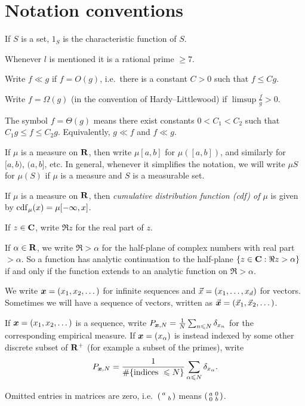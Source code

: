 \section{Notation conventions}

If $S$ is a set, $1_S$ is the characteristic function of $S$. 

Whenever $l$ is mentioned it is a rational prime $\geqslant 7$. 

Write $f\ll g$ if $f = O(g)$, i.e.~there is a constant $C>0$ such that 
$f \leqslant C g$. 

Write $f=\Omega(g)$ (in the convention of Hardy--Littlewood) if 
$\limsup \frac f g > 0$. 

The symbol $f = \Theta(g)$ means there exist constants $0<C_1<C_2$ such that 
$C_1 g \leqslant f \leqslant C_2 g$. Equivalently, $g \ll f$ and $f \ll g$. 

If $\mu$ is a measure on $\mathbf{R}$, then write $\mu[a,b]$ for $\mu([a,b])$, and 
similarly for $[a,b)$, $(a,b]$, etc. In general, whenever it simplifies the 
notation, we will write $\mu S$ for $\mu(S)$ if $\mu$ is a measure and 
$S$ is a measurable set. 

If $\mu$ is a measure on $\mathbf{R}$, then \emph{cumulative distribution function 
(cdf) of $\mu$} is given by $\operatorname{cdf}_\mu(x) = \mu[-\infty,x]$. 

If $z\in \mathbf{C}$, write $\Re z$ for the real part of $z$. 

If $\alpha\in \mathbf{R}$, we write $\Re > \alpha$ for the half-plane of complex 
numbers with real part $> \alpha$. So a function has analytic continuation to 
the half-plane $\{z\in \mathbf{C} : \Re z > \alpha\}$ if and only if the function 
extends to an analytic function on $\Re > \alpha$. 

We write ${\boldsymbol x} = (x_1,x_2,\dots)$ for infinite sequences and 
$\vec{x} = (x_1,\dots,x_d)$ for vectors. Sometimes we will have a sequence of 
vectors, written as $\vec{\boldsymbol x} = (\vec{x}_1,\vec{x}_2,\dots)$. 

If ${\boldsymbol x}=(x_1,x_2,\dots)$ is a sequence, write 
$P_{{\boldsymbol x},N} = \frac{1}{N} \sum_{n\leqslant N} \delta_{x_n}$ for the 
corresponding empirical measure. If ${\boldsymbol x}=(x_\alpha)$ is instead indexed by 
some other discrete subset of $\mathbf{R}^+$ (for example a subset of the primes), 
write 
\[
	P_{{\boldsymbol x},N} = \frac{1}{\# \{\text{indices }\leqslant N\}}\sum_{\alpha \leqslant N} \delta_{x_\alpha} .
\]

Omitted entries in matrices are zero, i.e.~$\left(\begin{smallmatrix} a &  \\  & b \end{smallmatrix}\right)$ means 
$\left(\begin{smallmatrix} a & 0 \\ 0 & b \end{smallmatrix}\right)$. 
